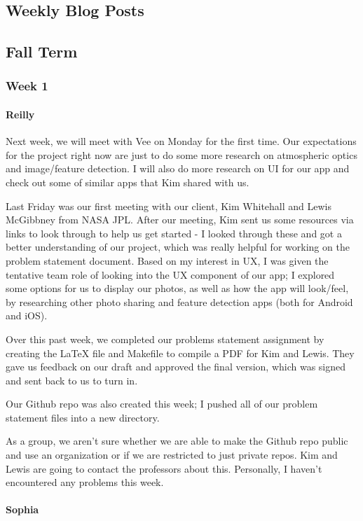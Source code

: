 \documentclass[onecolumn, draftclsnofoot,10pt, compsoc]{IEEEtran}
\begin{document}
\begin{flushleft}
 
\section{Weekly Blog Posts} 
\subsection{Fall Term}
\subsubsection{Week 1}
\paragraph{Reilly}
 
Next week, we will meet with Vee on Monday for the first time. Our expectations for the project right now are just to do some more research on atmospheric optics and image/feature detection. I will also do more research on UI for our app and check out some of similar apps that Kim shared with us.
 
Last Friday was our first meeting with our client, Kim Whitehall and Lewis McGibbney from NASA JPL. After our meeting, Kim sent us some resources via links to look through to help us get started - I looked through these and got a better understanding of our project, which was really helpful for working on the problem statement document. Based on my interest in UX, I was given the tentative team role of looking into the UX component of our app; I explored some options for us to display our photos, as well as how the app will look/feel, by researching other photo sharing and feature detection apps (both for Android and iOS).
 
Over this past week, we completed our problems statement assignment by creating the LaTeX file and Makefile to compile a PDF for Kim and Lewis. They gave us feedback on our draft and approved the final version, which was signed and sent back to us to turn in.
 
Our Github repo was also created this week; I pushed all of our problem statement files into a new directory.
 
 
As a group, we aren't sure whether we are able to make the Github repo public and use an organization or if we are restricted to just private repos. Kim and Lewis are going to contact the professors about this. Personally, I haven't encountered any problems this week.
 
\paragraph{Sophia}
 

\end{flushleft}
\end{document}
